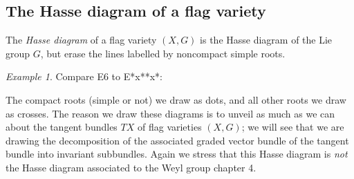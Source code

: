 \documentclass[a4paper,10pt]{amsart}
\theoremstyle{remark}
\newtheorem{example}{Example}
\begin{document}
\subsection{The Hasse diagram of a flag variety}\label{subsection:define.Hasse}
The \emph{Hasse diagram} of a flag variety \((X,G)\) is the Hasse diagram of the Lie group \(G\), but erase the lines labelled by noncompact simple roots.
\begin{example} 
Compare \dynkin E6 to \dynkin E{*x**x*}:
\end{example}
The compact roots (simple or not) we draw as dots, and all other roots we draw as crosses.
The reason we draw these diagrams is to unveil as much as we can about the tangent bundles \(TX\) of flag varieties \((X,G)\); we will see that we are drawing the decomposition of the associated graded vector bundle of the tangent bundle into invariant subbundles.
Again we stress that this Hasse diagram is \emph{not} the Hasse diagram associated to the Weyl group \cite{Baston/Eastwood:1989} chapter 4.
\end{document}
